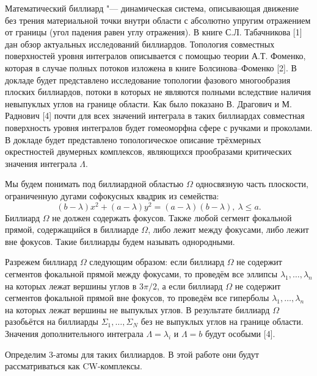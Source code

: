 \vzmscaption
Математический биллиард "--- динамическая система, опи\-сы\-вающая движение без трения материальной точки внутри области с абсолютно упругим отражением от границы (угол падения равен углу отражения). В книге С.Л. Табач\-никова [1] дан обзор актуальных исследований биллиардов. Тополо\-гия совместных поверхностей уровня интег\-ралов опи\-сывается с помощью теории А.Т. Фоменко, которая в случае полных потоков изло\-жена в книге Болсинова--Фоменко [2]. В докладе будет пред\-став\-лено ис\-следование топологии фазового много\-образия плос\-ких бил\-лиардов, потоки в которых не являются полными вследствие наличия не\-выпук\-лых углов на границе области. Как было показано В. Драгович и М. Раднович [4] почти для всех значений интеграла в таких биллиардах совместная поверхность уровня интегралов будет гомеоморфна сфере с ручками и проколами. В докладе будет пред\-ставлено топ\-олог\-ичес\-кое описание трёхмерных ок\-рест\-ностей дву\-мерных ком\-плек\-сов, являющихся прообразами критичес\-ких значения интеграла $\Lambda$.


Мы будем понимать под биллиардной областью $\Omega$ однос\-вязную часть плоскости, ограниченную дугами софокусных квадрик из семейства:
$$(b-\lambda)x^2+(a-\lambda)y^2=(a-\lambda)(b-\lambda),~\lambda \leq a. $$
Биллиард $\Omega$ не должен содержать фокусов. Также любой сегмент фокальной прямой, содержащийся в биллиарде $\Omega$, либо лежит между фокусами, либо лежит вне фокусов. Такие биллиарды будем называть однородными.

Разрежем биллиард $\Omega$ следующим образом: если биллиард $\Omega$ не содержит сегментов фокальной прямой между фокусами, то проведём все эллипсы $\lambda_1, \ldots, \lambda_n$ на которых лежат вершины углов в $3\pi/2$, а если биллиард $\Omega$ не содержит сегментов фокальной прямой вне фокусов, то проведём все гиперболы $\lambda_1, \ldots, \lambda_n$ на которых лежат вершины не выпуклых углов. В результате биллиард $\Omega$ разобьётся на биллиарды $\Sigma_1, \ldots, \Sigma_N$ без не выпуклых углов на границе области. Значения допол\-нитель\-ного интеграла $\Lambda = \lambda_i$ и $\Lambda = b$ будут особыми [4].

Определим 3-атомы для таких биллиардов. В этой работе они будут рассматриваться как CW-комплексы.

